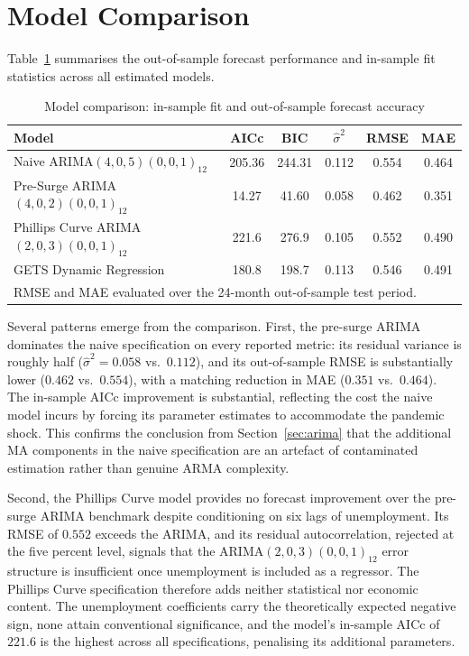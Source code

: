 \section{Model Comparison}
Table~\ref{tab:model_comparison} summarises the out-of-sample forecast performance and in-sample fit statistics across all estimated models.

\begin{table}[H]
\centering
\caption{Model comparison: in-sample fit and out-of-sample forecast accuracy}
\small{
\begin{tabular*}{\textwidth}{@{\extracolsep{\fill}}lccccc}
\hline \hline
\rule{0pt}{12pt}\textbf{Model} & \textbf{AICc} & \textbf{BIC} &
$\hat{\sigma}^2$ & \textbf{RMSE} & \textbf{MAE} \\[4pt]
\hline
\rule{0pt}{12pt}Naive ARIMA$(4,0,5)(0,0,1)_{12}$           & 205.36 & 244.31 & 0.112 & 0.554 & 0.464 \\[4pt]
\rule{0pt}{12pt}Pre-Surge ARIMA$(4,0,2)(0,0,1)_{12}$       &  14.27 &  41.60 & 0.058 & 0.462 & 0.351 \\[4pt]
\rule{0pt}{12pt}Phillips Curve ARIMA$(2,0,3)(0,0,1)_{12}$  & 221.6  & 276.9  & 0.105 & 0.552 & 0.490 \\[4pt]
\rule{0pt}{12pt}GETS Dynamic Regression                     & 180.8  & 198.7  & 0.113 & 0.546 & 0.491 \\[4pt]
\hline \hline
\multicolumn{6}{l}{\rule{0pt}{12pt}\footnotesize RMSE and MAE evaluated
over the 24-month out-of-sample test period.}
\end{tabular*}
}
\label{tab:model_comparison}
\end{table}
Several patterns emerge from the comparison. First, the pre-surge ARIMA dominates the naive specification on every reported metric: its residual variance is roughly half ($\hat{\sigma}^2 = 0.058$ vs.\ $0.112$), and its out-of-sample RMSE is substantially lower ($0.462$ vs.\ $0.554$), with a matching reduction in MAE ($0.351$ vs.\ $0.464$). The in-sample AICc improvement is substantial, reflecting the cost the naive model incurs by forcing its parameter estimates to accommodate the pandemic shock. This confirms the conclusion from Section~\ref{sec:arima} that the additional MA components in the naive specification are an artefact of contaminated estimation rather than genuine ARMA complexity.

Second, the Phillips Curve model provides no forecast improvement over the pre-surge ARIMA benchmark despite conditioning on six lags of unemployment. Its RMSE of $0.552$ exceeds the ARIMA, and its residual autocorrelation, rejected at the five percent level, signals that the ARIMA$(2,0,3)(0,0,1)_{12}$ error structure is insufficient once unemployment is included as a regressor. The Phillips Curve specification therefore adds neither statistical nor economic content. The unemployment coefficients carry the theoretically expected negative sign, none attain conventional
significance, and the model's in-sample AICc of $221.6$ is the highest across all specifications, penalising its additional parameters.


